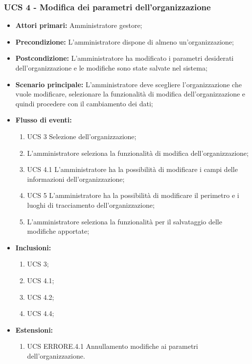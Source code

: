 \subsubsection{UCS 4 - Modifica dei parametri dell'organizzazione}%
\begin{itemize}
    \item \textbf{Attori primari:} Amministratore gestore;
    \item \textbf{Precondizione:} L’amministratore dispone di almeno un'organizzazione;
    \item \textbf{Postcondizione:} L’amministratore ha modificato i parametri desiderati dell'organizzazione e le modifiche sono state salvate nel sistema;
    \item \textbf{Scenario principale:} L'amministratore deve scegliere l'organizzazione che vuole modificare, selezionare la funzionalità di modifica dell'organizzazione e quindi procedere con il cambiamento dei dati;
    \item \textbf{Flusso di eventi:}
    \begin{enumerate}
        \item UCS 3 Selezione dell'organizzazione;
        \item L'amministratore seleziona la funzionalità di modifica dell'organizzazione;
        \item UCS 4.1 L'amministratore ha la possibilità di modificare i campi delle informazioni dell’organizzazione;
        \item UCS 5 L'amministratore ha la possibilità di modificare il perimetro e i luoghi di tracciamento dell’organizzazione;
        \item L'amministratore seleziona la funzionalità per il salvataggio delle modifiche apportate;
    \end{enumerate}
    \item \textbf{Inclusioni:}
    \begin{enumerate}
        \item UCS 3;
        \item UCS 4.1;
        \item UCS 4.2;
        \item UCS 4.4;
    \end{enumerate}
    \item \textbf{Estensioni:}
    \begin{enumerate}
        \item UCS ERRORE.4.1 Annullamento modifiche ai parametri dell'organizzazione.
    \end{enumerate}
\end{itemize}

